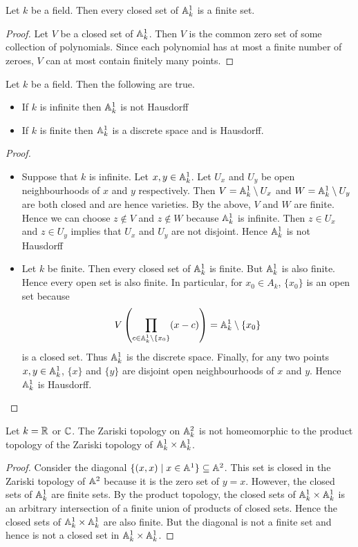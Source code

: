 \documentclass[a4paper]{article}
\begin{document}
\begin{lmm}{}{} Let $k$ be a field. Then every closed set of $\mathbb{A}_k^1$ is a finite set. \tcbline
\begin{proof}
Let $V$ be a closed set of $\mathbb{A}_k^1$. Then $V$ is the common zero set of some collection of polynomials. Since each polynomial has at most a finite number of zeroes, $V$ can at most contain finitely many points. 
\end{proof}
\end{lmm}

\begin{eg}{}{} Let $k$ be a field. Then the following are true. 
\begin{itemize}
\item If $k$ is infinite then $\mathbb{A}_k^1$ is not Hausdorff
\item If $k$ is finite then $\mathbb{A}_k^1$ is a discrete space and is Hausdorff. 
\end{itemize} \tcbline
\begin{proof}~\\
\begin{itemize}
\item Suppose that $k$ is infinite. Let $x,y\in\mathbb{A}_k^1$. Let $U_x$ and $U_y$ be open neighbourhoods of $x$ and $y$ respectively. Then $V=\mathbb{A}_k^1\setminus U_x$ and $W=\mathbb{A}_k^1\setminus U_y$ are both closed and are hence varieties. By the above, $V$ and $W$ are finite. Hence we can choose $z\notin V$ and $z\notin W$ because $\mathbb{A}_k^1$ is infinite. Then $z\in U_x$ and $z\in U_y$ implies that $U_x$ and $U_y$ are not disjoint. Hence $\mathbb{A}_k^1$ is not Hausdorff
\item Let $k$ be finite. Then every closed set of $\mathbb{A}_k^1$ is finite. But $\mathbb{A}_k^1$ is also finite. Hence every open set is also finite. In particular, for $x_0\in A_k$, $\{x_0\}$ is an open set because $$V\left(\prod_{c\in\mathbb{A}_k^1\setminus\{x_0\}}(x-c)\right)=\mathbb{A}_k^1\setminus\{x_0\}$$ is a closed set. Thus $\mathbb{A}_k^1$ is the discrete space. Finally, for any two points $x,y\in\mathbb{A}_k^1$, $\{x\}$ and $\{y\}$ are disjoint open neighbourhoods of $x$ and $y$. Hence $\mathbb{A}_k^1$ is Hausdorff. 
\end{itemize}
\end{proof}
\end{eg}

\begin{eg}{}{} Let $k=\mathbb{R}$ or $\mathbb{C}$. The Zariski topology on $\mathbb{A}_k^2$ is not homeomorphic to the product topology of the Zariski topology of $\mathbb{A}_k^1\times\mathbb{A}_k^1$. \tcbline
\begin{proof}
Consider the diagonal $\{(x,x)\;|\;x\in\mathbb{A}^1\}\subseteq\mathbb{A}^2$. This set is closed in the Zariski topology of $\mathbb{A}^2$ because it is the zero set of $y=x$. However, the closed sets of $\mathbb{A}_k^1$ are finite sets. By the product topology, the closed sets of $\mathbb{A}_k^1\times\mathbb{A}_k^1$ is an arbitrary intersection of a finite union of products of closed sets. Hence the closed sets of $\mathbb{A}_k^1\times\mathbb{A}_k^1$ are also finite. But the diagonal is not a finite set and hence is not a closed set in $\mathbb{A}_k^1\times\mathbb{A}_k^1$. 
\end{proof}
\end{eg}
\end{document}

